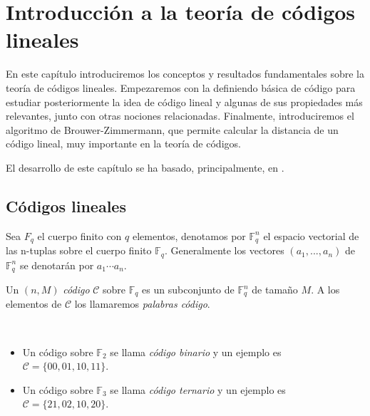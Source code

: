 
\chapter{Introducción a la teoría de códigos lineales}
\label{cap:2}

En este capítulo introduciremos los conceptos y resultados fundamentales sobre la teoría de códigos lineales. Empezaremos con la definiendo básica de código para estudiar posteriormente la idea de código lineal y algunas de sus propiedades más relevantes, junto con otras nociones relacionadas. Finalmente, introduciremos el algoritmo de Brouwer-Zimmermann, que permite calcular la distancia de un código lineal, muy importante en la teoría de códigos. 

El desarrollo de este capítulo se ha basado, principalmente, en \cite[Capítulo 1]{Huffman_Pless_2010}.

\section{Códigos lineales}

Sea $F_q$ el cuerpo finito con $q$ elementos, denotamos por $\mathbb{F}_q^n$ el espacio vectorial de las n-tuplas sobre el cuerpo finito $\mathbb{F}_q$. Generalmente los vectores $(a_1, ..., a_n)$ de $\mathbb{F}_q^n$ se denotarán por $a_1 \cdots a_n$.

\begin{definition}
    Un $(n, M)$ \emph{código} $\mathcal{C}$ sobre $\mathbb{F}_q$ es un subconjunto de 
    $\mathbb{F}_q^n$ de tamaño $M$. A los elementos de $\mathcal{C}$ los llamaremos \emph{palabras código}.
\end{definition}

\begin{exampleth}
    $ $
    \begin{itemize}
        \item Un código sobre $\mathbb{F}_2$ se llama \emph{código binario} y un ejemplo es $\mathcal{C} = \{00, 01, 10, 11\}$.
        \item Un código sobre $\mathbb{F}_3$ se llama \emph{código ternario} y un ejemplo es $\mathcal{C} = \{21, 02, 10, 20\}$.
    \end{itemize}
\end{exampleth}

